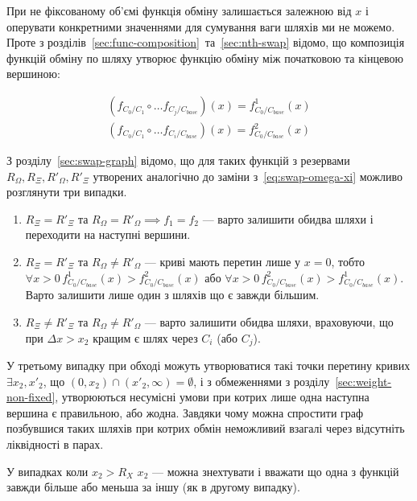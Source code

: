 \documentclass[../index.tex]{subfiles}
\begin{document}
При не фіксованому об'ємі функція обміну залишається залежною від $x$ і
оперувати конкретними значеннями для сумування ваги шляхів ми не можемо. Проте з
розділів~\ref{sec:func-composition}~та~\ref{sec:nth-swap} відомо, що композиція
функцій обміну по шляху утворює функцію обміну між початковою та кінцевою
вершиною:

\begin{equation*}
 \begin{aligned}
   (f_{C_{0}/C_{1}} \circ \ldots f_{C_{j}/C_{base}})(x) = f_{C_{0}/C_{base}}^{1}(x)\\
   (f_{C_{0}/C_{1}} \circ \ldots f_{C_{i}/C_{base}})(x) = f_{C_{0}/C_{base}}^{2}(x)
 \end{aligned}
\end{equation*}

З розділу~\ref{sec:swap-graph} відомо, що для таких функцій з резервами
$R_{\Omega}, R_{\Xi}, R'_{\Omega}, R'_{\Xi}$ утворених аналогічно до заміни
з~\eqref{eq:swap-omega-xi} можливо розглянути три випадки.

\begin{enumerate}
  \item $R_{\Xi} = R'_{\Xi}$ та $R_{\Omega} = R'_{\Omega} \implies f_{1} = f_{2}$ --- варто
		залишити обидва шляхи і переходити на наступні вершини.
  \item $R_{\Xi} = R'_{\Xi}$ та $R_{\Omega} \neq R'_{\Omega}$ --- криві мають перетин лише у
		$x = 0$, тобто
		$\forall x > 0 \, f_{C_{0}/C_{base}}^{1}(x) > f_{C_{0}/C_{base}}^{2}(x)$ або
		$\forall x > 0 \, f_{C_{0}/C_{base}}^{2}(x) > f_{C_{0}/C_{base}}^{1}(x)$. Варто
		залишити лише один з шляхів що є завжди більшим.
  \item $R_{\Xi} \neq R'_{\Xi}$ та $R_{\Omega} \neq R'_{\Omega}$ --- варто залишити обидва шляхи,
		враховуючи, що при $\Delta x > x_{2}$ кращим є шлях через $C_{i}$ (або
		$C_{j}$).
\end{enumerate}

У третьому випадку при обході можуть утворюватися такі точки перетину кривих
$\exists x_{2}, x'_{2}$, що $\left(0, x_{2}\right) \cap{} \left(x'_{2}, \infty{} \right) = \emptyset$,
і з обмеженнями з розділу~\ref{sec:weight-non-fixed}, утворюються несумісні
умови при котрих лише одна наступна вершина є правильною, або жодна. Завдяки
чому можна спростити граф позбувшися таких шляхів при котрих обмін неможливий
взагалі через відсутніть ліквідності в парах.

У випадках коли $x_{2} > R_{X}$ $x_{2}$ --- можна знехтувати і вважати що одна з
функцій завжди більше або меньша за іншу (як в другому випадку).
\end{document}
